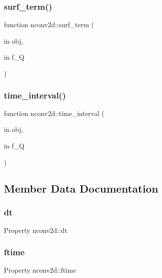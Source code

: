 \mbox{\label{classnconv2d_aa77b913ace97fe22a15a44369fd04b6a}} 
\subsubsection{\texorpdfstring{surf\+\_\+term()}{surf\_term()}}
{\footnotesize\ttfamily function nconv2d\+::surf\+\_\+term (\begin{DoxyParamCaption}\item[{in}]{obj,  }\item[{in}]{f\+\_\+Q }\end{DoxyParamCaption})}

\mbox{\label{classnconv2d_a92dd63999cc12f1dca10a0b94b0eb78b}} 
\subsubsection{\texorpdfstring{time\+\_\+interval()}{time\_interval()}}
{\footnotesize\ttfamily function nconv2d\+::time\+\_\+interval (\begin{DoxyParamCaption}\item[{in}]{obj,  }\item[{in}]{f\+\_\+Q }\end{DoxyParamCaption})}



\subsection{Member Data Documentation}
\mbox{\label{classnconv2d_a1446865f5d1c8da7297b94f1c7abef9e}} 
\subsubsection{\texorpdfstring{dt}{dt}}
{\footnotesize\ttfamily Property nconv2d\+::dt}

\mbox{\label{classnconv2d_ae3d23d76d8bfbb9f5f56a3f0120ba77e}} 
\subsubsection{\texorpdfstring{ftime}{ftime}}
{\footnotesize\ttfamily Property nconv2d\+::ftime}

